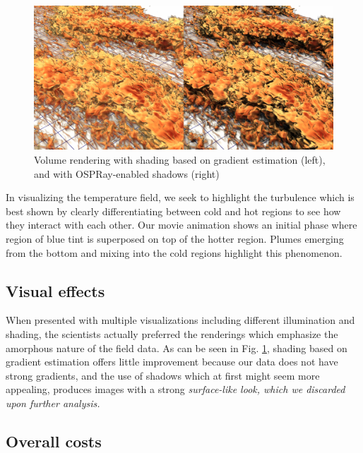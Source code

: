 \documentclass[final,5p,times,twocolumn]{elsarticle}
\begin{document}
\begin{figure}
	\centering
	\includegraphics[width=\linewidth]{fig2montage}%
	\caption{\label{fig:shadings} Volume rendering with shading based on gradient
estimation (left), and with OSPRay-enabled shadows (right)}
\end{figure}

In visualizing the temperature field, we seek to highlight the turbulence which
is best shown by clearly differentiating between cold and hot regions to see how
they interact with each other. Our movie animation shows an initial phase where
region of blue tint is superposed on top of the hotter region. Plumes emerging
from the bottom and mixing into the cold regions highlight this phenomenon.

\subsection{Visual effects}

When presented with multiple visualizations including different illumination and
shading, the scientists actually preferred the renderings which emphasize the
amorphous nature of the field data. As can be seen in Fig. \ref{fig:shadings},
shading based on gradient estimation offers little improvement because our data
does not have strong gradients, and the use of shadows which at first might seem
more appealing, produces images with a strong \it{surface-like} \rm look, which
we discarded upon further analysis.

\subsection{Overall costs}
\end{document}
